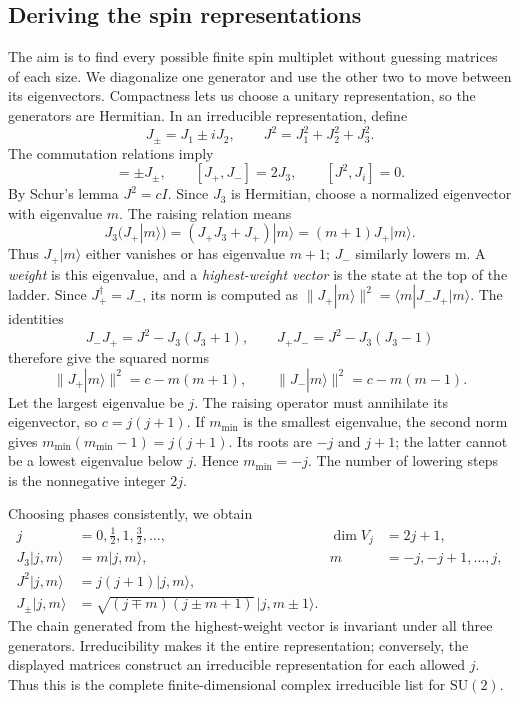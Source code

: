 \documentclass[11pt]{article}
\newcommand{\SU}{\mathrm{SU}}
\begin{document}
\subsection{Deriving the spin representations}
The aim is to find every possible finite spin multiplet without guessing
matrices of each size. We diagonalize one generator and use the other two
to move between its eigenvectors. Compactness lets us choose a unitary
representation, so the generators are Hermitian. In an irreducible
representation, define
\[
 J_\pm=J_1\pm iJ_2,\qquad
 J^2=J_1^2+J_2^2+J_3^2.
\]
The commutation relations imply
\begin{equation}
 [J_3,J_\pm]=\pm J_\pm,\qquad
 [J_+,J_-]=2J_3,\qquad [J^2,J_i]=0.
 \label{eq:ladder-algebra}
\end{equation}
By Schur's lemma \(J^2=cI\). Since \(J_3\) is Hermitian, choose a
normalized eigenvector with eigenvalue \(m\). The raising relation means
\[
 J_3(J_+|m\rangle)
 =(J_+J_3+J_+)|m\rangle=(m+1)J_+|m\rangle.
\]
Thus \(J_+|m\rangle\) either vanishes or has eigenvalue \(m+1\);
\(J_-\) similarly lowers m. A \emph{weight} is this eigenvalue, and a
\emph{highest-weight vector} is the state at the top of the ladder.
Since \(J_+^\dagger=J_-\), its norm is computed as
\(\|J_+|m\rangle\|^2=\langle m|J_-J_+|m\rangle\). The identities
\[
 J_-J_+=J^2-J_3(J_3+1),\qquad
 J_+J_-=J^2-J_3(J_3-1)
\]
therefore give the squared norms
\begin{equation}
 \|J_+|m\rangle\|^2=c-m(m+1),\qquad
 \|J_-|m\rangle\|^2=c-m(m-1).
 \label{eq:ladder-norms}
\end{equation}
Let the largest eigenvalue be \(j\). The raising operator must annihilate
its eigenvector, so \(c=j(j+1)\). If \(m_{\min}\) is the smallest
eigenvalue, the second norm gives
\(m_{\min}(m_{\min}-1)=j(j+1)\). Its roots are \(-j\) and \(j+1\);
the latter cannot be a lowest eigenvalue below \(j\). Hence
\(m_{\min}=-j\). The number of lowering steps is the nonnegative
integer \(2j\).

Choosing phases consistently, we obtain
\begin{align}
 j&=0,\tfrac12,1,\tfrac32,\ldots,
 & \dim V_j&=2j+1,\label{eq:spin-labels}\\
 J_3|j,m\rangle&=m|j,m\rangle,
 &m&=-j,-j+1,\ldots,j,\\
 J^2|j,m\rangle&=j(j+1)|j,m\rangle,\\
 J_\pm|j,m\rangle
 &=\sqrt{(j\mp m)(j\pm m+1)}\,|j,m\pm1\rangle.
 \label{eq:ladder-action}
\end{align}
The chain generated from the highest-weight vector is invariant under
all three generators. Irreducibility makes it the entire representation;
conversely, the displayed matrices construct an irreducible representation
for each allowed \(j\). Thus this is the complete finite-dimensional
complex irreducible list for \(\SU(2)\).
\end{document}
